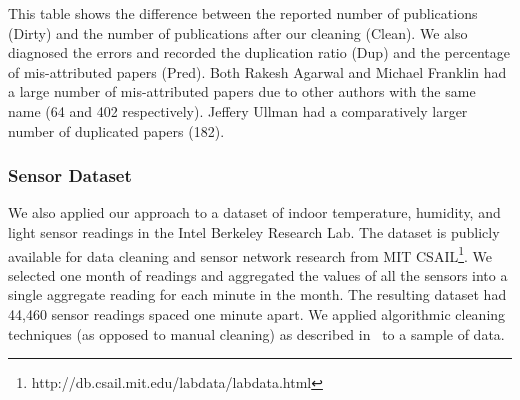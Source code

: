 This table shows the difference between the reported number of publications (Dirty) and the number of publications after our cleaning (Clean).
We also diagnosed the errors and recorded the duplication ratio (Dup) and the percentage of mis-attributed papers (Pred).
Both Rakesh Agarwal and Michael Franklin had a large number of mis-attributed papers due to other authors with the same name (64 and 402 respectively).
Jeffery Ullman had a comparatively larger number of duplicated papers (182).

\subsubsection{Sensor Dataset}\label{exp:sensor}
We also applied our approach to a dataset of indoor temperature, humidity, and light sensor readings in the Intel Berkeley Research Lab.
The dataset is publicly available for data cleaning and sensor network research from MIT CSAIL\footnote{\scriptsize http://db.csail.mit.edu/labdata/labdata.html}.
We selected one month of readings and aggregated the values of all the sensors into a single aggregate reading for each minute in the month.
The resulting dataset had 44,460 sensor readings spaced one minute apart.
We applied algorithmic cleaning techniques (as opposed to manual cleaning) as described in~\cite{DBLP:conf/pervasive/JefferyAFHW06} to a sample of data.


